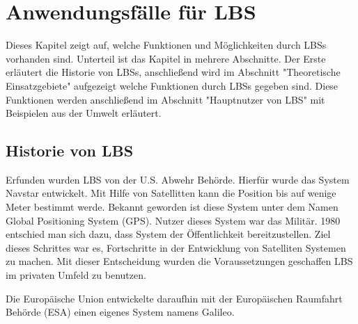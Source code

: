 \section{Anwendungsfälle für LBS}

%
Dieses Kapitel zeigt auf, welche Funktionen und Möglichkeiten durch LBSs vorhanden sind. Unterteil ist das Kapitel in mehrere Abschnitte. Der Erste erläutert die Historie von LBSs, anschließend wird im Abschnitt "Theoretische Einsatzgebiete" aufgezeigt welche Funktionen durch LBSs gegeben sind. Diese Funktionen werden anschließend im Abschnitt "Hauptnutzer von LBS" mit Beispielen aus der Umwelt erläutert.


\subsection{Historie von LBS}
Erfunden wurden LBS von der U.S. Abwehr Behörde. Hierfür wurde das System Navstar entwickelt. Mit Hilfe von Satellitten kann die Position bis auf wenige Meter bestimmt werde. Bekannt geworden ist diese System unter dem Namen Global Positioning System (GPS). Nutzer dieses System war das Militär. 1980 entschied man sich dazu, dass System der Öffentlichkeit bereitzustellen. Ziel dieses Schrittes war es, Fortschritte in der Entwicklung von Satelliten Systemen zu machen. Mit dieser Entscheidung wurden die Voraussetzungen geschaffen LBS im privaten Umfeld zu benutzen.

Die Europäische Union entwickelte daraufhin mit der Europäischen Raumfahrt Behörde (ESA) einen eigenes System namens Galileo.

